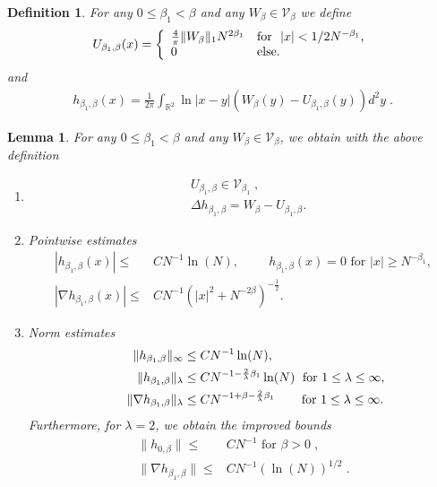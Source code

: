 \documentclass[11pt, english, american]{article}
\newtheorem{lemma}[theorem]{Lemma}
\newtheorem{definition}[theorem] {Definition}
\begin{document}
\begin{definition}\label{udef}%
For any $0\leq\beta_1< \beta$ and any $W_{\beta}\in\mathcal{V}_\beta$ we define
$$U_{\beta_1,\beta}(x)=\left\{
         \begin{array}{ll}
           \frac{4}{\pi}\|W_{\beta}\|_1N^{2\beta_1} & \hbox{for \ $|x|<1/2 N^{-\beta_1}$,} \\
           0 & \hbox{else.}
         \end{array}
       \right.
$$
and
\begin{align} \label{defh} h_{\beta_1,\beta}(x)=  \frac{1}{2\pi} \int_{\mathbb R^2}   \ln|x-y| 
(W_{\beta}(y)-U_{\beta_1,\beta}(y))d^2y
\; .
\end{align}
\end{definition}
\begin{lemma}\label{ulemma}
For any $0\leq  \beta_1<  \beta$ and any $W_{\beta}\in\mathcal{V}_\beta$, we obtain with the above definition
\begin{enumerate}
\item
\begin{align*}
& U_{\beta_1,\beta} \in \mathcal{V}_{\beta_1}\;,
\\
&\Delta h_{\beta_1,\beta}=W_{\beta}-U_{\beta_1,\beta}
.
\end{align*}
\item Pointwise estimates
\begin{align}\label{extraz}
|h_{\beta_1,\beta}(x)|\leq&  CN^{-1} \ln (N) , \hspace{1cm}
h_{\beta_1,\beta}(x) =0 \text{ for } |x| \geq N^{- \beta_1} ,
\\|\nabla h_{\beta_1,\beta}(x)|\leq&  CN^{-1}\left(\vert x\vert ^2+N^{-2\beta}\right)^{-\frac{1}{2}}.\label{extrazb}
\end{align}
%
\item Norm estimates
\begin{align*}
\|h_{\beta_1,\beta}\|_\infty & \leq CN^{-1} \ln (N),\\
\hspace{1cm}\|h_{\beta_1,\beta}\|_{\lambda}& \leq CN^{-1-\frac{2}{\lambda}\beta_1} \ln (N)\;\text{ for }1\le \lambda \leq\infty ,
%
\\\|\nabla h_{\beta_1,\beta}\|_{\lambda}&\leq CN^{-1+\beta-\frac{2}{\lambda}\beta_1} \hspace{0.63cm} \text{ for }1\le \lambda \leq\infty.
 \end{align*}
Furthermore, for $\lambda=2$, we obtain the improved bounds
 \begin{align}
\|h_{0,\beta}\| \leq &C N^{-1} \text{ for } \beta>0
\; ,
\\
 \|\nabla h_{\beta_1,\beta}\|\leq& CN^{-1} (\ln (N))^{1/2}
 \;.
\end{align}
 \end{enumerate}
\end{lemma}
\end{document}
